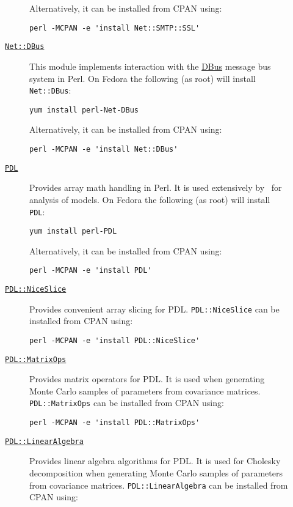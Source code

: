 \begin{description}
\begin{description}
Alternatively, it can be installed from CPAN using:
\begin{verbatim}
perl -MCPAN -e 'install Net::SMTP::SSL'
\end{verbatim}
  \item [\href{http://search.cpan.org/~danberr/Net-DBus-0.33.6/lib/Net/DBus.pm}{{\tt Net::DBus}}] This module implements interaction with the \href{http://www.freedesktop.org/wiki/Software/dbus}{DBus} message bus system in Perl. On Fedora the following (as root) will install {\tt Net::DBus}:
\begin{verbatim}
yum install perl-Net-DBus
\end{verbatim}
Alternatively, it can be installed from CPAN using:
\begin{verbatim}
perl -MCPAN -e 'install Net::DBus'
\end{verbatim}
  \item [\href{http://pdl.perl.org/}{{\tt PDL}}] Provides array math handling in Perl. It is used extensively by \glc\ for analysis of models. On Fedora the following (as root) will install {\tt PDL}:
\begin{verbatim}
yum install perl-PDL
\end{verbatim}
Alternatively, it can be installed from CPAN using:
\begin{verbatim}
perl -MCPAN -e 'install PDL'
\end{verbatim}
  \item [\href{http://search.cpan.org/dist/PDL-NiceSlice/NiceSlice.pm}{{\tt PDL::NiceSlice}}] Provides convenient array slicing for PDL. {\tt PDL::NiceSlice} can be installed from CPAN using:
\begin{verbatim}
perl -MCPAN -e 'install PDL::NiceSlice'
\end{verbatim}
  \item [\href{http://search.cpan.org/~chm/PDL-2.4.7/Basic/MatrixOps/matrixops.pd}{{\tt PDL::MatrixOps}}] Provides matrix operators for PDL. It is used when generating Monte Carlo samples of parameters from covariance matrices. {\tt PDL::MatrixOps} can be installed from CPAN using:
\begin{verbatim}
perl -MCPAN -e 'install PDL::MatrixOps'
\end{verbatim}
  \item [\href{http://search.cpan.org/~ellipse/PDL-LinearAlgebra-0.06/LinearAlgebra.pm}{{\tt PDL::LinearAlgebra}}] Provides linear algebra algorithms for PDL. It is used for Cholesky decomposition when generating Monte Carlo samples of parameters from covariance matrices. {\tt PDL::LinearAlgebra} can be installed from CPAN using:

\end{description}
\end{description}
